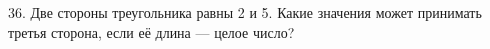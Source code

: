 36. Две стороны треугольника равны 2 и 5. Какие значения может принимать третья сторона, если её длина --- целое число?\\
